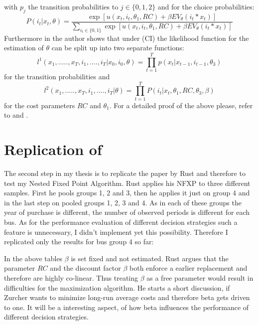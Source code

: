\documentclass[a4paper,12pt,bold]{scrartcl}
\begin{document}
with \(p_j\) the transition probabilities to \(j \in \{0,1,2\}\) and for the choice probabilities:
\begin{equation}
P(i_t | x_t, \theta) = \frac{\exp[u(x_t, i_t, \theta_1, RC) + \beta EV_{\theta} (i_t * x_t)]}{ \sum_{i_t \in \{0, 1\}}\exp[u(x_t, i_t, \theta_1, RC) + \beta EV_{\theta} (i_t * x_t)]}
\end{equation}
Furthermore in \cite{Rust.1988} the author shows that under (CI) the likelihood function for the estimation of \(\theta\) can be split up into two separate functions:
\begin{equation}
  l^1(x_1, .....,  x_T, i_1, ...., i_T | x_0, i_0, \theta) = \prod_{t = 1}^T p(x_t | x_{t-1}, i_{t-1}, \theta_3)
\end{equation}
for the transition probabilities and
\begin{equation}
  l^2(x_1, .....,  x_T, i_1, ...., i_T | \theta) = \prod_{t = 1}^T P(i_t | x_t, \theta_1, RC, \theta_3, \beta)
\end{equation}
for the cost parameters $RC$ and \(\theta_1\). For a detailed proof of the above please, refer to \cite{Rust.1987} and \cite{Rust.1988}.
\newpage
\section{Replication of \cite{Rust.1987}}
The second step in my thesis is to replicate the paper by Rust and therefore to test my Nested Fixed Point Algorithm. Rust applies his NFXP to three different samples. First he pools groups 1, 2 and 3, then he applies it just on group 4 and in the last step on pooled groups 1, 2, 3 and 4. As in each of these groups the year of purchase is different, the number of observed periods is different for each bus. As for the performance evaluation of different decision strategies such a feature is unnecessary, I didn't implement yet this possibility. Therefore I replicated only the results for bus group 4 so far:



In the above tables $\beta$ is set fixed and not estimated. Rust argues that the parameter $RC$ and the discount factor $\beta$ both enforce a earlier replacement and therefore are highly co-linear. Thus treating $\beta$ as a free parameter would result in difficulties for the maximization algorithm. He starts a short discussion, if Zurcher wants to minimize long-run average costs and therefore beta gets driven to one. It will be a interesting aspect, of how beta influences the performance of different decision strategies.
\end{document}
